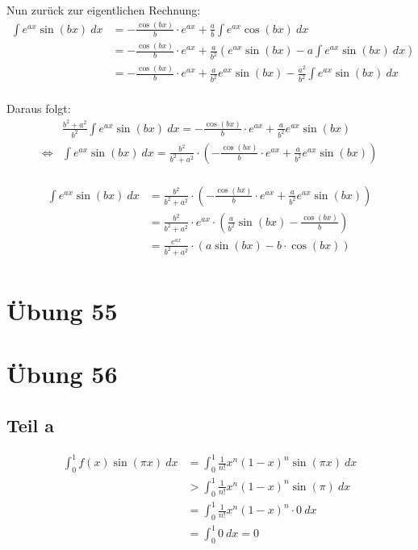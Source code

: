 \documentclass[a4paper,10pt]{article}
\begin{document}
Nun zurück zur eigentlichen Rechnung:
\begin{align*}
 \int e^{ax} \sin(bx)\ dx & = -\frac{\cos(bx)}{b} \cdot e^{ax} + \frac{a}{b} \int e^{ax}\cos(bx)\ dx\\
 & = -\frac{\cos(bx)}{b} \cdot e^{ax} + \frac{a}{b^2} \left( e^{ax} \sin(bx) - a \int e^{ax} \sin(bx) \ dx \right)\\
 & = -\frac{\cos(bx)}{b} \cdot e^{ax} + \frac{a}{b^2} e^{ax} \sin(bx) - \frac{a^2}{b^2} \int e^{ax} \sin(bx) \ dx\\
\end{align*}

Daraus folgt:
\begin{align*}
 & \frac{b^2 + a^2}{b^2} \int e^{ax} \sin(bx)\ dx = -\frac{\cos(bx)}{b} \cdot e^{ax} + \frac{a}{b^2} e^{ax} \sin(bx)\\
 \Leftrightarrow & \int e^{ax} \sin(bx)\ dx = \frac{b^2}{b^2 + a^2} \cdot \left( -\frac{\cos(bx)}{b} \cdot e^{ax} + \frac{a}{b^2} e^{ax} \sin(bx) \right)\\
\end{align*}

\begin{align*}
 \int e^{ax} \sin(bx)\ dx & = \frac{b^2}{b^2 + a^2} \cdot \left( -\frac{\cos(bx)}{b} \cdot e^{ax} + \frac{a}{b^2} e^{ax} \sin(bx) \right)\\
 & = \frac{b^2}{b^2 + a^2} \cdot e^{ax} \cdot \left( \frac{a}{b^2} \sin(bx) - \frac{\cos(bx)}{b} \right)\\
 & = \frac{e^{ax}}{b^2 + a^2} \cdot \left( a \sin(bx) - b \cdot \cos(bx) \right)\\
\end{align*}

\section*{Übung 55}

\section*{Übung 56}

\subsection*{Teil a}

\begin{align*}
 \int_0^1 f(x) \sin(\pi x)\ dx & = \int_0^1 \frac{1}{n!} x^n (1 - x)^n \sin(\pi x)\ dx\\
 & > \int_0^1 \frac{1}{n!} x^n (1 - x)^n \sin(\pi)\ dx\\
 & = \int_0^1 \frac{1}{n!} x^n (1 - x)^n \cdot 0\ dx\\
 & = \int_0^1 0\ dx = 0\\
\end{align*}
\end{document}
